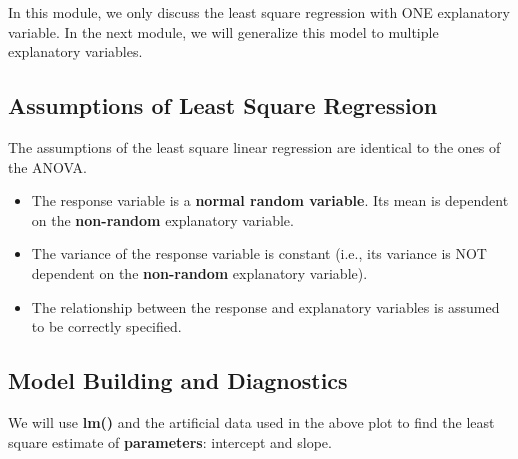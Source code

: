 \documentclass[
]{book}
\newenvironment{Shaded}{\begin{snugshade}}{\end{snugshade}}
\newcommand{\AttributeTok}[1]{\textcolor[rgb]{0.13,0.29,0.53}{#1}}
\newcommand{\DecValTok}[1]{\textcolor[rgb]{0.00,0.00,0.81}{#1}}
\newcommand{\FunctionTok}[1]{\textcolor[rgb]{0.13,0.29,0.53}{\textbf{#1}}}
\newcommand{\NormalTok}[1]{#1}
\newcommand{\OtherTok}[1]{\textcolor[rgb]{0.56,0.35,0.01}{#1}}
\newcommand{\SpecialCharTok}[1]{\textcolor[rgb]{0.81,0.36,0.00}{\textbf{#1}}}
\newcommand{\StringTok}[1]{\textcolor[rgb]{0.31,0.60,0.02}{#1}}
\begin{document}
In this module, we only discuss the least square regression with ONE explanatory variable. In the next module, we will generalize this model to multiple explanatory variables.

\hypertarget{assumptions-of-least-square-regression}{%
\subsection{Assumptions of Least Square Regression}\label{assumptions-of-least-square-regression}}

The assumptions of the least square linear regression are identical to the ones of the ANOVA.

\begin{itemize}
\item
  The response variable is a \textbf{normal random variable}. Its mean is dependent on the \textbf{non-random} explanatory variable.
\item
  The variance of the response variable is constant (i.e., its variance is NOT dependent on the \textbf{non-random} explanatory variable).
\item
  The relationship between the response and explanatory variables is assumed to be correctly specified.
\end{itemize}

\hypertarget{model-building-and-diagnostics}{%
\subsection{Model Building and Diagnostics}\label{model-building-and-diagnostics}}

We will use \textbf{lm()} and the artificial data used in the above plot to find the least square estimate of \textbf{parameters}: intercept and slope.

\begin{Shaded}
\end{Shaded}
\end{document}
